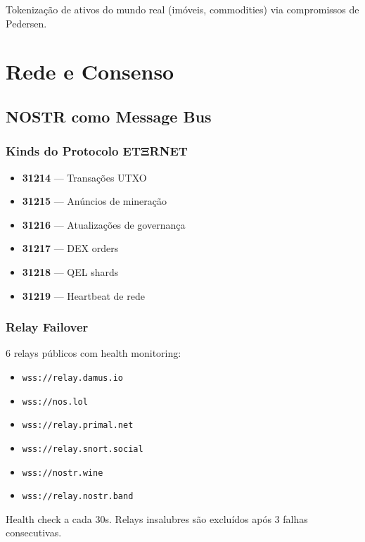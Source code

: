 \documentclass[12pt,a4paper,twoside]{book}
\theoremstyle{remark}
\begin{document}
Tokenização de ativos do mundo real (imóveis, commodities) via compromissos de Pedersen.

\part{Rede e Consenso}

\chapter{NOSTR como Message Bus}
\label{chap:nostr}

\section{Kinds do Protocolo ETΞRNET}

\begin{itemize}
    \item \textbf{31214} — Transações UTXO
    \item \textbf{31215} — Anúncios de mineração
    \item \textbf{31216} — Atualizações de governança
    \item \textbf{31217} — DEX orders
    \item \textbf{31218} — QEL shards
    \item \textbf{31219} — Heartbeat de rede
\end{itemize}

\section{Relay Failover}

6 relays públicos com health monitoring:

\begin{itemize}
    \item \texttt{wss://relay.damus.io}
    \item \texttt{wss://nos.lol}
    \item \texttt{wss://relay.primal.net}
    \item \texttt{wss://relay.snort.social}
    \item \texttt{wss://nostr.wine}
    \item \texttt{wss://relay.nostr.band}
\end{itemize}

Health check a cada 30s. Relays insalubres são excluídos após 3 falhas consecutivas.
\end{document}
